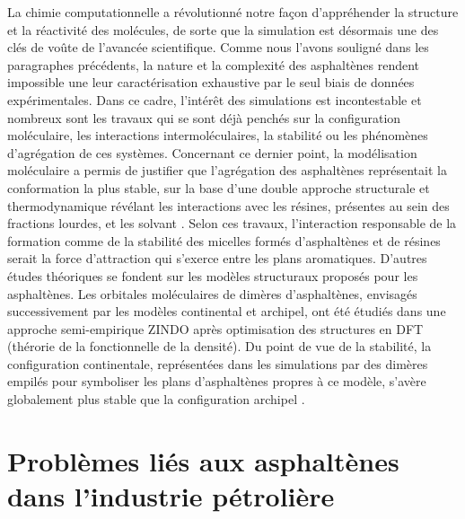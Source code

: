 	La chimie computationnelle a révolutionné notre façon d'appréhender la structure et la réactivité des molécules, de sorte que la simulation est désormais une des clés de voûte de l'avancée scientifique. 
	Comme nous l'avons souligné dans les paragraphes précédents, la nature et la complexité des asphaltènes rendent impossible une leur caractérisation exhaustive par le seul biais de données expérimentales. Dans ce cadre, l'intérêt des simulations est incontestable et nombreux sont les travaux qui se sont déjà penchés sur la configuration moléculaire, les interactions intermoléculaires, la stabilité ou les phénomènes d'agrégation de ces systèmes.  
	Concernant ce dernier point, la modélisation moléculaire a permis de justifier que l'agrégation des asphaltènes représentait la conformation la plus stable, sur la base d'une double approche structurale et thermodynamique révélant les interactions avec les résines, présentes au sein des fractions lourdes, et les solvant \cite{murgich1996molecular}. Selon ces travaux, l'interaction responsable de la formation comme de la stabilité des micelles formés d'asphaltènes et de résines serait la force d'attraction qui s'exerce entre les plans aromatiques. 
	D'autres études théoriques se fondent sur les modèles structuraux proposés pour les asphaltènes. Les orbitales moléculaires de dimères d'asphaltènes, envisagés successivement par les modèles continental et archipel, ont été étudiés dans une approche semi-empirique ZINDO après optimisation des structures en DFT (thérorie de la fonctionnelle de la densité). Du point de vue de la stabilité, la configuration continentale, représentées dans les simulations par des dimères empilés pour symboliser les plans d'asphaltènes propres à ce modèle, s'avère globalement plus stable que la configuration archipel \cite{alvarez2013island}. 
	
	
	
	
	
	
	\bigskip
	
	\section{Problèmes liés aux asphaltènes dans l'industrie pétrolière}
	
